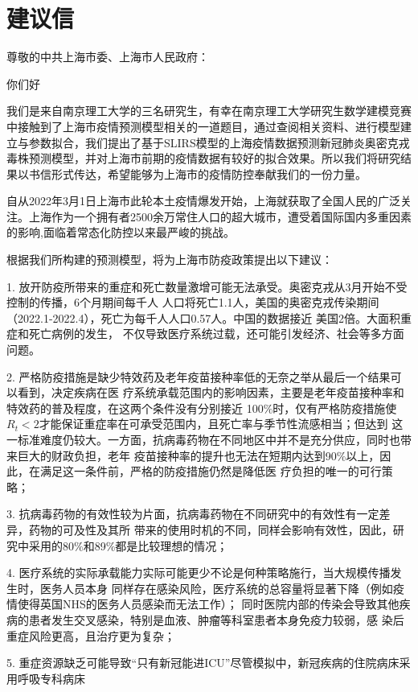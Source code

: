 \documentclass[bwprint]{gmcmthesis}
\numberwithin{figure}{section}
\begin{document}
\section{建议信}
\begin{flushleft}
    尊敬的中共上海市委、上海市人民政府：
\end{flushleft}
\par 你们好
\par 我们是来自南京理工大学的三名研究生，有幸在南京理工大学研究生数学建模竞赛中接触到了上海市疫情预测模型相关的一道题目，通过查阅相关资料、进行模型建立与参数拟合，我们提出了基于SLIRS模型的上海疫情数据预测新冠肺炎奥密克戎毒株预测模型，并对上海市前期的疫情数据有较好的拟合效果。所以我们将研究结果以书信形式传达，希望能够为上海市的疫情防控奉献我们的一份力量。
\par 自从2022年3月1日上海市此轮本土疫情爆发开始，上海就获取了全国人民的广泛关注。上海作为一个拥有者2500余万常住人口的超大城市，遭受着国际国内多重因素的影响,面临着常态化防控以来最严峻的挑战。
\par 根据我们所构建的预测模型，将为上海市防疫政策提出以下建议：
\par 1. 放开防疫所带来的重症和死亡数量激增可能无法承受。奥密克戎从3月开始不受控制的传播，6个月期间每千人
人口将死亡1.1人，美国的奥密克戎传染期间（2022.1-2022.4），死亡为每千人人口0.57人。中国的数据接近
美国2倍。大面积重症和死亡病例的发生， 不仅导致医疗系统过载，还可能引发经济、社会等多方面问题。
\par 2. 严格防疫措施是缺少特效药及老年疫苗接种率低的无奈之举从最后一个结果可以看到，决定疾病在医
疗系统承载范围内的影响因素，主要是老年疫苗接种率和特效药的普及程度，在这两个条件没有分别接近
100$\%$时，仅有严格防疫措施使$R_t<2$才能保证重症率在可承受范围内，且死亡率与季节性流感相当；但达到
这一标准难度仍较大。一方面，抗病毒药物在不同地区中并不是充分供应，同时也带来巨大的财政负担，老年
疫苗接种率的提升也无法在短期内达到90$\%$以上，因此，在满足这一条件前，严格的防疫措施仍然是降低医
疗负担的唯一的可行策略；
\par 3. 抗病毒药物的有效性较为片面，抗病毒药物在不同研究中的有效性有一定差异，药物的可及性及其所
带来的使用时机的不同，同样会影响有效性，因此，研究中采用的80$\%$和89$\%$都是比较理想的情况；
\par 4. 医疗系统的实际承载能力实际可能更少不论是何种策略施行，当大规模传播发生时，医务人员本身
同样存在感染风险，医疗系统的总容量将显著下降（例如疫情使得英国NHS的医务人员感染而无法工作）；
同时医院内部的传染会导致其他疾病的患者发生交叉感染，特别是血液、肿瘤等科室患者本身免疫力较弱，感
染后重症风险更高，且治疗更为复杂；
\par 5. 重症资源缺乏可能导致“只有新冠能进ICU”尽管模拟中，新冠疾病的住院病床采用呼吸专科病床
\end{document}
